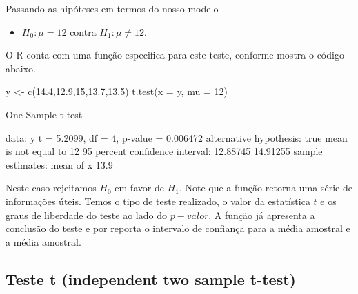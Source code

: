 \documentclass[
  10pt,
  a4paper]{book}
\newenvironment{Shaded}{\begin{snugshade}}{\end{snugshade}}
\newcommand{\AttributeTok}[1]{\textcolor[rgb]{0.77,0.63,0.00}{#1}}
\newcommand{\DecValTok}[1]{\textcolor[rgb]{0.00,0.00,0.81}{#1}}
\newcommand{\FloatTok}[1]{\textcolor[rgb]{0.00,0.00,0.81}{#1}}
\newcommand{\FunctionTok}[1]{\textcolor[rgb]{0.00,0.00,0.00}{#1}}
\newcommand{\NormalTok}[1]{#1}
\newcommand{\OtherTok}[1]{\textcolor[rgb]{0.56,0.35,0.01}{#1}}
\newcommand{\SpecialCharTok}[1]{\textcolor[rgb]{0.00,0.00,0.00}{#1}}
\providecommand{\tightlist}{%
  \setlength{\itemsep}{0pt}\setlength{\parskip}{0pt}}
\begin{document}
Passando as hipóteses em termos do nosso modelo

\begin{itemize}
\tightlist
\item
  \(H_0: \mu = 12\) contra \(H_1: \mu \neq 12\).
\end{itemize}

O R conta com uma função especifica para este teste, conforme mostra o código abaixo.

\begin{Shaded}
\begin{Highlighting}[]
\NormalTok{y }\OtherTok{\textless{}{-}} \FunctionTok{c}\NormalTok{(}\FloatTok{14.4}\NormalTok{,}\FloatTok{12.9}\NormalTok{,}\DecValTok{15}\NormalTok{,}\FloatTok{13.7}\NormalTok{,}\FloatTok{13.5}\NormalTok{)}
\FunctionTok{t.test}\NormalTok{(}\AttributeTok{x =}\NormalTok{ y, }\AttributeTok{mu =} \DecValTok{12}\NormalTok{)}

\NormalTok{    One Sample t}\SpecialCharTok{{-}}\NormalTok{test}

\NormalTok{data}\SpecialCharTok{:}\NormalTok{  y}
\NormalTok{t }\OtherTok{=} \FloatTok{5.2099}\NormalTok{, df }\OtherTok{=} \DecValTok{4}\NormalTok{, p}\SpecialCharTok{{-}}\NormalTok{value }\OtherTok{=} \FloatTok{0.006472}
\NormalTok{alternative hypothesis}\SpecialCharTok{:}\NormalTok{ true mean is not equal to }\DecValTok{12}
\DecValTok{95}\NormalTok{ percent confidence interval}\SpecialCharTok{:}
 \FloatTok{12.88745} \FloatTok{14.91255}
\NormalTok{sample estimates}\SpecialCharTok{:}
\NormalTok{mean of x }
     \FloatTok{13.9} 
\end{Highlighting}
\end{Shaded}

Neste caso rejeitamos \(H_0\) em favor de \(H_1\). Note que a função retorna uma série de informações úteis. Temos o tipo de teste realizado, o valor da estatística \(t\) e os graus de liberdade do teste ao lado do \(p-valor\). A função já apresenta a conclusão do teste e por reporta o intervalo de confiança para a média amostral e a média amostral.

\hypertarget{teste-t-independent-two-sample-t-test}{%
\subsection{Teste t (independent two sample t-test)}\label{teste-t-independent-two-sample-t-test}}
\end{document}
